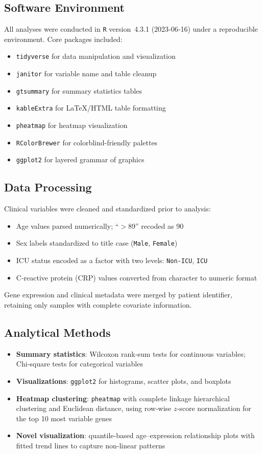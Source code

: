 \documentclass[a4paper,12pt]{article}
\begin{document}
\subsection{Software Environment}
All analyses were conducted in \texttt{R} version~4.3.1 (2023‑06‑16) under a reproducible environment. Core packages included:
\begin{itemize}
    \item \texttt{tidyverse} \cite{tidyverse} for data manipulation and visualization
    \item \texttt{janitor} \cite{janitor} for variable name and table cleanup
    \item \texttt{gtsummary} \cite{gtsummary} for summary statistics tables
    \item \texttt{kableExtra} \cite{kableExtra} for LaTeX/HTML table formatting
    \item \texttt{pheatmap} \cite{pheatmap} for heatmap visualization
    \item \texttt{RColorBrewer} \cite{RColorBrewer} for colorblind-friendly palettes
    \item \texttt{ggplot2} \cite{ggplot2} for layered grammar of graphics
\end{itemize}

\subsection{Data Processing}
Clinical variables were cleaned and standardized prior to analysis:
\begin{itemize}
    \item Age values parsed numerically; ``$>$89'' recoded as 90
    \item Sex labels standardized to title case (\texttt{Male}, \texttt{Female})
    \item ICU status encoded as a factor with two levels: \texttt{Non‑ICU}, \texttt{ICU}
    \item C‑reactive protein (CRP) values converted from character to numeric format
\end{itemize}
Gene expression and clinical metadata were merged by patient identifier, retaining only samples with complete covariate information.

\subsection{Analytical Methods}
\begin{itemize}
    \item \textbf{Summary statistics}: Wilcoxon rank‑sum tests for continuous variables; Chi‑square tests for categorical variables
    \item \textbf{Visualizations}: \texttt{ggplot2} for histograms, scatter plots, and boxplots
    \item \textbf{Heatmap clustering}: \texttt{pheatmap} with complete linkage hierarchical clustering and Euclidean distance, using row‑wise $z$‑score normalization for the top 10 most variable genes
    \item \textbf{Novel visualization}: quantile‑based age–expression relationship plots with fitted trend lines to capture non‑linear patterns
\end{itemize}
\end{document}
